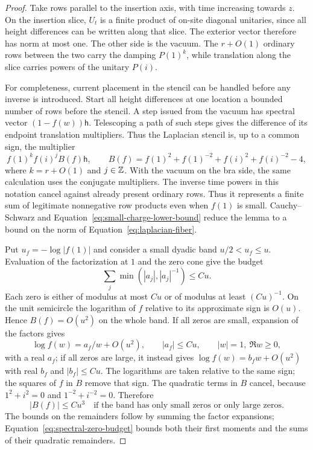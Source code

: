 \begin{proof}
Take rows parallel to the insertion axis, with time increasing
towards $z$.  On the insertion slice, $U_t$ is a finite product of
on-site diagonal unitaries, since all height differences can be
written along that slice.  The exterior vector therefore has norm
at most one.  The other side is the vacuum.  The $r+O(1)$ ordinary
rows between the two carry the damping $P(1)^k$, while translation
along the slice carries powers of the unitary $P(i)$.

For completeness, current placement in the stencil can be handled
before any inverse is introduced.  Start all height differences
at one location a bounded number of rows before the stencil.  A
step issued from the vacuum has spectral vector
$(1-f(w))\mathsf h$.  Telescoping a path of such steps gives the
difference of its endpoint translation multipliers.  Thus the
Laplacian stencil is, up to a common sign, the multiplier
\begin{equation}\label{eq:laplacian-fiber}
 f(1)^k f(i)^j B(f)\mathsf h,\qquad
 B(f)=f(1)^2+f(1)^{-2}+f(i)^2+f(i)^{-2}-4,
\end{equation}
where $k=r+O(1)$ and $j\in\mathbb Z$.  With the vacuum on the bra side,
the same calculation uses the conjugate multipliers.  The inverse
time powers in this notation cancel against already present
ordinary rows.  Thus it represents a finite sum of legitimate
nonnegative row products even when $f(1)$ is small.  Cauchy--Schwarz
and Equation~\eqref{eq:small-charge-lower-bound} reduce the lemma
to a bound on the norm of Equation~\eqref{eq:laplacian-fiber}.

Put $u_f=-\log|f(1)|$ and consider a small dyadic band
$u/2<u_f\le u$.  Evaluation of the factorization at $1$ and the
zero cone give the budget
\begin{equation}\label{eq:spectral-zero-budget}
 \sum_j\min(|a_j|,|a_j|^{-1})\le Cu.
\end{equation}
Each zero is either of modulus at most $Cu$ or of modulus at least
$(Cu)^{-1}$.  On the unit semicircle the logarithm of $f$ relative
to its approximate sign is $O(u)$.  Hence $B(f)=O(u^2)$ on the
whole band.  If all zeros are small, expansion of the factors gives
\[
 \log f(w)=a_f/w+O(u^2),\qquad |a_f|\le Cu,
 \qquad |w|=1,\ \Re w\ge0,
\]
with a real $a_f$; if all zeros are large, it instead gives
$\log f(w)=b_fw+O(u^2)$ with real $b_f$ and $|b_f|\le Cu$.
The logarithms are taken relative to the same sign; the squares
of $f$ in $B$ remove that sign.  The quadratic terms in $B$ cancel, because
$1^2+i^2=0$ and $1^{-2}+i^{-2}=0$.  Therefore
\begin{equation}\label{eq:pure-band-cancellation}
 |B(f)|\le Cu^3
 \quad\text{if the band has only small zeros or only large zeros}.
\end{equation}
The bounds on the remainders follow by summing the factor expansions;
Equation~\eqref{eq:spectral-zero-budget} bounds both their first
moments and the sums of their quadratic remainders.


\end{proof}
